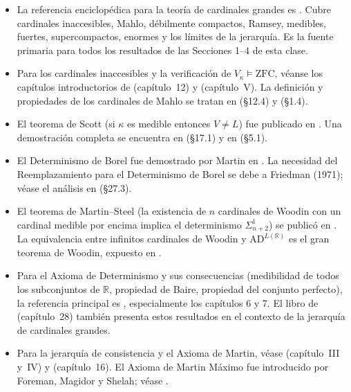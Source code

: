 \begin{itemize}[leftmargin=2em]
  \item La referencia enciclopédica para la teoría de cardinales grandes es \cite{kanamori2003}. Cubre cardinales inaccesibles, Mahlo, débilmente compactos, Ramsey, medibles, fuertes, supercompactos, enormes y los límites de la jerarquía. Es la fuente primaria para todos los resultados de las Secciones 1--4 de esta clase.

  \item Para los cardinales inaccesibles y la verificación de $V_\kappa \models \mathrm{ZFC}$, véanse los capítulos introductorios de \cite{jech2003} (capítulo~12) y \cite{kunen2011} (capítulo~V). La definición y propiedades de los cardinales de Mahlo se tratan en \cite{jech2003} (§12.4) y \cite{kanamori2003} (§1.4).

  \item El teorema de Scott (si $\kappa$ es medible entonces $V \neq L$) fue publicado en \cite{scott1961}. Una demostración completa se encuentra en \cite{jech2003} (§17.1) y en \cite{kanamori2003} (§5.1).

  \item El Determinismo de Borel fue demostrado por Martin en \cite{martin1975}. La necesidad del Reemplazamiento para el Determinismo de Borel se debe a Friedman (1971); véase el análisis en \cite{kanamori2003} (§27.3).

  \item El teorema de Martin--Steel (la existencia de $n$ cardinales de Woodin con un cardinal medible por encima implica el determinismo $\Sigma^1_{n+2}$) se publicó en \cite{martinSteel1988}. La equivalencia entre infinitos cardinales de Woodin y $\mathrm{AD}^{L(\mathbb{R})}$ es el gran teorema de Woodin, expuesto en \cite{woodin2010det}.

  \item Para el Axioma de Determinismo y sus consecuencias (medibilidad de todos los subconjuntos de $\mathbb{R}$, propiedad de Baire, propiedad del conjunto perfecto), la referencia principal es \cite{moschovakis2009}, especialmente los capítulos 6 y 7. El libro de \cite{kanamori2003} (capítulo~28) también presenta estos resultados en el contexto de la jerarquía de cardinales grandes.

  \item Para la jerarquía de consistencia y el Axioma de Martin, véase \cite{kunen2011} (capítulo~III y~IV) y \cite{jech2003} (capítulo~16). El Axioma de Martin Máximo fue introducido por Foreman, Magidor y Shelah; véase \cite{foreman1988}.


\end{itemize}
